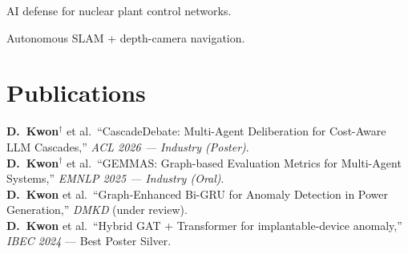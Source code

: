 \documentclass[]{deedy-resume-openfont}
\begin{document}
\begin{minipage}[t]{0.66\textwidth}
 
AI defense for nuclear plant control networks.
\sectionsep

 
Autonomous SLAM + depth-camera navigation.
\sectionsep

\section{Publications}
\textbf{D.~Kwon}$^{\dagger}$ et al.\ ``CascadeDebate: Multi-Agent Deliberation for Cost-Aware LLM Cascades,'' \emph{ACL 2026 --- Industry (Poster)}.\\[0.15em]
\textbf{D.~Kwon}$^{\dagger}$ et al.\ ``GEMMAS: Graph-based Evaluation Metrics for Multi-Agent Systems,'' \emph{EMNLP 2025 --- Industry (Oral)}.\\[0.15em]
\textbf{D.~Kwon} et al.\ ``Graph-Enhanced Bi-GRU for Anomaly Detection in Power Generation,'' \emph{DMKD} (under review).\\[0.15em]
\textbf{D.~Kwon} et al.\ ``Hybrid GAT + Transformer for implantable-device anomaly,'' \emph{IBEC 2024} --- Best Poster Silver.

\end{minipage}
\end{document}
